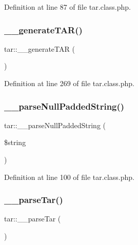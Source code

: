 Definition at line 87 of file tar.\+class.\+php.

\hypertarget{classtar_a97fd04b02c85bbb3eb588a160237f375}{}\label{classtar_a97fd04b02c85bbb3eb588a160237f375} 
\subsubsection{\texorpdfstring{\+\_\+\+\_\+generate\+T\+A\+R()}{\_\_generateTAR()}}
{\footnotesize\ttfamily tar\+::\+\_\+\+\_\+generate\+T\+AR (\begin{DoxyParamCaption}{ }\end{DoxyParamCaption})}



Definition at line 269 of file tar.\+class.\+php.

\hypertarget{classtar_ab9d60205cd0862d6d3cfb582b43a3288}{}\label{classtar_ab9d60205cd0862d6d3cfb582b43a3288} 
\subsubsection{\texorpdfstring{\+\_\+\+\_\+parse\+Null\+Padded\+String()}{\_\_parseNullPaddedString()}}
{\footnotesize\ttfamily tar\+::\+\_\+\+\_\+parse\+Null\+Padded\+String (\begin{DoxyParamCaption}\item[{}]{\$string }\end{DoxyParamCaption})}



Definition at line 100 of file tar.\+class.\+php.

\hypertarget{classtar_a8d8793668fa7e2de0beb4dca399ee3ed}{}\label{classtar_a8d8793668fa7e2de0beb4dca399ee3ed} 
\subsubsection{\texorpdfstring{\+\_\+\+\_\+parse\+Tar()}{\_\_parseTar()}}
{\footnotesize\ttfamily tar\+::\+\_\+\+\_\+parse\+Tar (\begin{DoxyParamCaption}{ }\end{DoxyParamCaption})}



